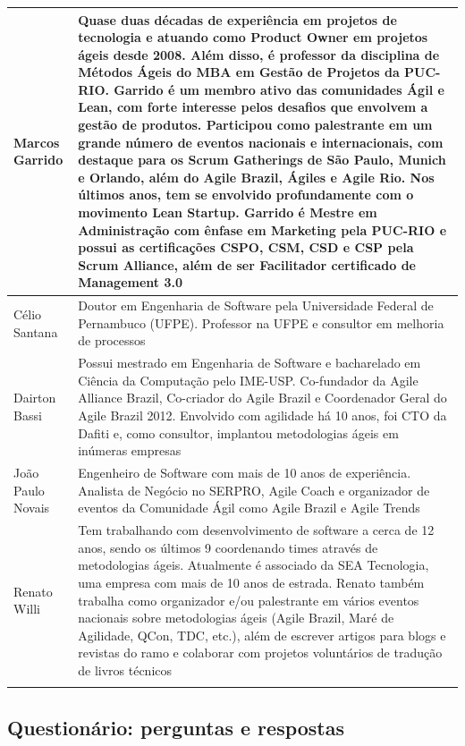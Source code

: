 \begin{tabularx}{\linewidth}{ | p{4cm} | X | }
	Marcos Garrido & Quase duas décadas de experiência em projetos de tecnologia e atuando como Product Owner em projetos ágeis desde 2008. Além disso, é professor da disciplina de Métodos Ágeis do MBA em Gestão de Projetos da PUC-RIO. Garrido é um membro ativo das comunidades Ágil e Lean, com forte interesse pelos desafios que envolvem a gestão de produtos. Participou como palestrante em um grande número de eventos nacionais e internacionais, com destaque para os Scrum Gatherings de São Paulo, Munich e Orlando, além do Agile Brazil, Ágiles e Agile Rio. Nos últimos anos, tem se envolvido profundamente com o movimento Lean Startup. Garrido é Mestre em Administração com ênfase em Marketing pela PUC-RIO e possui as certificações CSPO, CSM, CSD e CSP pela Scrum Alliance, além de ser Facilitador certificado de Management 3.0 \\ \hline
	Célio Santana & Doutor em Engenharia de Software pela Universidade Federal de Pernambuco (UFPE). Professor na UFPE e consultor em melhoria de processos \\ \hline
	Dairton Bassi & Possui mestrado em Engenharia de Software e bacharelado em Ciência da Computação pelo IME-USP. Co-fundador da Agile Alliance Brazil, Co-criador do Agile Brazil e Coordenador Geral do Agile Brazil 2012. Envolvido com agilidade há 10 anos, foi CTO da Dafiti e, como consultor, implantou metodologias ágeis em inúmeras empresas \\ \hline
	João Paulo Novais & Engenheiro de Software com mais de 10 anos de experiência. Analista de Negócio no SERPRO, Agile Coach e organizador de eventos da Comunidade Ágil como Agile Brazil e Agile Trends \\ \hline
	Renato Willi & Tem trabalhando com desenvolvimento de software a cerca de 12 anos, sendo os últimos 9 coordenando times através de metodologias ágeis. Atualmente é associado da SEA Tecnologia, uma empresa com mais de 10 anos de estrada. Renato também trabalha como organizador e/ou palestrante em vários eventos nacionais sobre metodologias ágeis (Agile Brazil, Maré de Agilidade, QCon, TDC, etc.), além de escrever artigos para blogs e revistas do ramo e colaborar com projetos voluntários de tradução de livros técnicos\\ \hline
	\captionsetup{justification=centering}
	\caption{Resumo sobre alguns profissionais da área de TI que responderam o formulário e se identificaram}
	\label{tab:mini-cvs}
\end{tabularx}

\subsection{Questionário: perguntas e respostas}

